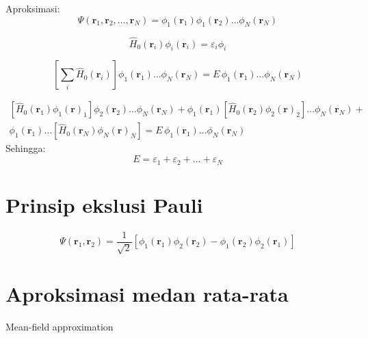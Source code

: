 \documentclass[a4paper,12pt]{article} %
\begin{document}
Aproksimasi:
\begin{equation}
\Psi(\mathbf{r}_{1},\mathbf{r}_{2},\ldots,\mathbf{r}_{N}) =
\phi_{1}(\mathbf{r}_{1}) \phi_{1}(\mathbf{r}_{2}) \ldots \phi_{N}(\mathbf{r}_{N})
\end{equation}

\begin{equation}
\hat{H}_{0}(\mathbf{r}_{i}) \phi_{i}(\mathbf{r}_{i}) = \varepsilon_{i}\phi_{i}
\end{equation}

\begin{equation}
\left[ \sum_{i} \hat{H}_{0}(\mathbf{r}_{i}) \right]
\phi_{1}(\mathbf{r}_{1}) \ldots \phi_{N}(\mathbf{r}_{N}) =
E\,\phi_{1}(\mathbf{r}_{1}) \ldots \phi_{N}(\mathbf{r}_{N})
\end{equation}

\begin{align*}
\left[ \hat{H}_{0}(\mathbf{r}_{1}) \phi_{1}(\mathbf{r})_{1} \right]
\phi_{2}(\mathbf{r}_{2}) \ldots \phi_{N}(\mathbf{r}_{N}) +
\phi_{1}(\mathbf{r}_{1}) \left[ \hat{H}_{0}(\mathbf{r}_{2}) \phi_{2}(\mathbf{r})_{2} \right]
\ldots \phi_{N}(\mathbf{r}_{N}) + \\
\phi_{1}(\mathbf{r}_{1}) \ldots \left[ \hat{H}_{0}(\mathbf{r}_{N}) \phi_{N}(\mathbf{r})_{N} \right]
= E\,\phi_{1}(\mathbf{r}_{1}) \ldots \phi_{N}(\mathbf{r}_{N})
\end{align*}
Sehingga:
\begin{equation}
E = \varepsilon_{1} + \varepsilon_{2} + \ldots + \varepsilon_{N}
\end{equation}

\section{Prinsip ekslusi Pauli}

\begin{equation}
\Psi(\mathbf{r}_{1},\mathbf{r}_{2}) = \frac{1}{\sqrt{2}}
\left[ \phi_{1}(\mathbf{r}_{1}) \phi_{2}(\mathbf{r}_{2}) -
\phi_{1}(\mathbf{r}_{2}) \phi_{2}(\mathbf{r}_{1})
\right]
\end{equation}

\section{Aproksimasi medan rata-rata}

Mean-field approximation






\end{document}
